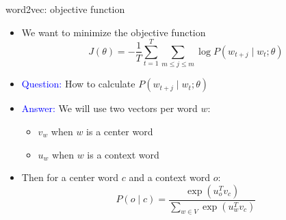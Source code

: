 \documentclass[usenames,dvipsnames,english]{beamer}
\begin{document}
\begin{frame}{word2vec: objective function}
\begin{itemize}
\setlength{\itemsep}{1.2em}
    \item We want to minimize the objective function
    $$
    J(\theta)=-\frac{1}{T} \sum_{t=1}^{T} \sum_{m \leq j \leq m} \log P\left(w_{t+j} \mid w_{t} ; \theta\right)
    $$
    \item \textcolor{blue}{Question:} How to calculate $P\left(w_{t+j} \mid w_{t};\theta\right)$
    \item \textcolor{blue}{Answer:} We will use two vectors per word $w$:
    \begin{itemize}
    \setlength{\itemsep}{0.8em}
    \vspace{5pt}
        \item $v_w$ when $w$ is a center word
        \item $u_w$ when $w$ is a context word
    \end{itemize}
    \item Then for a center word $c$ and a context word $o$:
    $$
    P(o \mid c)=\frac{\exp \left(u_{o}^{T} v_{c}\right)}{\sum_{w \in V} \exp \left(u_{w}^{T} v_{c}\right)}
    $$
    \end{itemize}
\end{frame}
\end{document}
